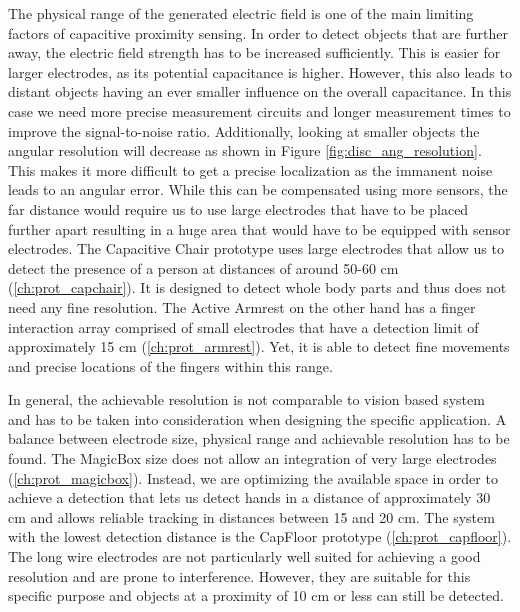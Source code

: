 The physical range of the generated electric field is one of the main limiting factors of capacitive proximity sensing. In order to detect objects that are further away,  the electric field strength has to be increased sufficiently. This is easier for larger electrodes, as its potential capacitance is higher. However, this also leads to distant objects having an ever smaller influence on the overall capacitance. In this case we need more precise measurement circuits and longer measurement times to improve the signal-to-noise ratio. Additionally, looking at smaller objects the angular resolution will decrease as shown in Figure \ref{fig:disc_ang_resolution}. This makes it more difficult to get a precise localization as the immanent noise leads to an angular error. While this can be compensated using more sensors, the far distance would require us to use large electrodes that have to be placed further apart resulting in a huge area that would have to be equipped with sensor electrodes. The Capacitive Chair prototype uses large electrodes that allow us to detect the presence of a person at distances of around 50-60 cm (\ref{ch:prot_capchair}). It is designed to detect whole body parts and thus does not need any fine resolution. The Active Armrest on the other hand has a finger interaction array comprised of small electrodes that have a detection limit of approximately 15 cm (\ref{ch:prot_armrest}). Yet, it is able to detect fine movements and precise locations of the fingers within this range.

In general, the achievable resolution is not comparable to vision based system and has to be taken into consideration when designing the specific application. A balance between electrode size, physical range and achievable resolution has to be found. The MagicBox size does not allow an integration of very large electrodes (\ref{ch:prot_magicbox}). Instead, we are optimizing the available space in order to achieve a detection that lets us detect hands in a distance of approximately 30 cm and allows reliable tracking in distances between 15 and 20 cm. The system with the lowest detection distance is the CapFloor prototype (\ref{ch:prot_capfloor}). The long wire electrodes are not particularly well suited for achieving a good resolution and are prone to interference. However, they are suitable for this specific purpose and objects at a proximity of 10 cm or less can still be detected. 

